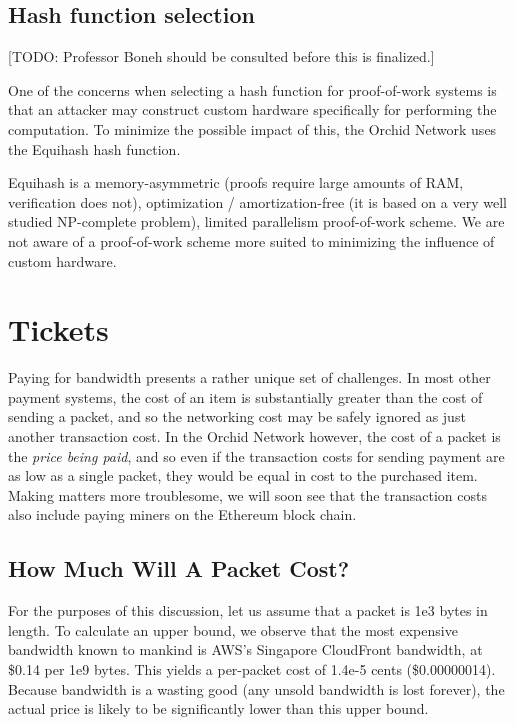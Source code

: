 \documentclass{article}
\newcommand{\orchid}{Orchid}
\newcommand{\Orchid}{\orchid}
\begin{document}
\subsection{Hash function selection}

[TODO: Professor Boneh should be consulted before this is finalized.]

One of the concerns when selecting a hash function for proof-of-work
systems is that an attacker may construct custom hardware specifically
for performing the computation. To minimize the possible impact of
this, the \Orchid{} Network uses the Equihash hash function\cite{Equihash}.

Equihash is a memory-asymmetric (proofs require large amounts of RAM,
verification does not), optimization / amortization-free (it is based on
a very well studied NP-complete problem), limited parallelism
proof-of-work scheme. We are not aware of a proof-of-work scheme more
suited to minimizing the influence of custom hardware.

\section{Tickets}
\label{sec:tickets}

Paying for bandwidth presents a rather unique set of challenges. In most other payment systems, the cost of an item is substantially greater than the cost of sending a packet, and so the networking cost may be safely ignored as just another transaction cost. In the \Orchid{} Network however, the cost of a packet is the \emph{price being paid}, and so even if the transaction costs for sending payment are as low as a single packet, they would be equal in cost to the purchased item. Making matters more troublesome, we will soon see that the transaction costs also include paying miners on the Ethereum block chain.

\subsection{How Much Will A Packet Cost?}

For the purposes of this discussion, let us assume that a packet is 1e3 bytes in length. To calculate an upper bound, we observe that the most expensive bandwidth known to mankind is AWS's Singapore CloudFront bandwidth, at \$0.14 per 1e9 bytes. This yields a per-packet cost of 1.4e-5 cents (\$0.00000014). Because bandwidth is a wasting good (any unsold bandwidth is lost forever), the actual price is likely to be significantly lower than this upper bound.
\end{document}
